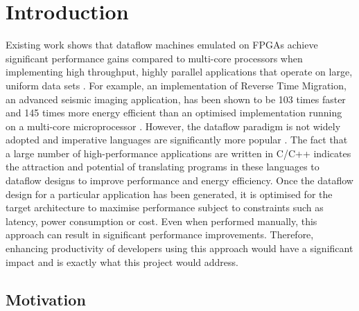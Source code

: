 \chapter{Introduction}
\renewcommand{\thepage}{\arabic{page}}

Existing work shows that dataflow machines emulated on FPGAs achieve
significant performance gains compared to multi-core processors when
implementing high throughput, highly parallel applications that
operate on large, uniform data sets \cite{Flynn:Pell:Mencer:2012,
  Mencer:2012}.  For example, an implementation of Reverse Time
Migration, an advanced seismic imaging application, has been shown to
be 103 times faster and 145 times more energy efficient than an
optimised implementation running on a multi-core microprocessor
\cite{Xinyu:Qiwei:Luk:Qiang:Pell:2012}. However, the dataflow paradigm
is not widely adopted and imperative languages are significantly more
popular \cite{Tiobe:2012}. The fact that a large number of
high-performance applications are written in C/C++ indicates the
attraction and potential of translating programs in these languages to
dataflow designs to improve performance and energy efficiency. Once
the dataflow design for a particular application has been generated,
it is optimised for the target architecture to maximise performance
subject to constraints such as latency, power consumption or
cost. Even when performed manually, this approach can result in
significant performance improvements. Therefore, enhancing
productivity of developers using this approach would have a
significant impact and is exactly what this project would address.

\section{Motivation}

